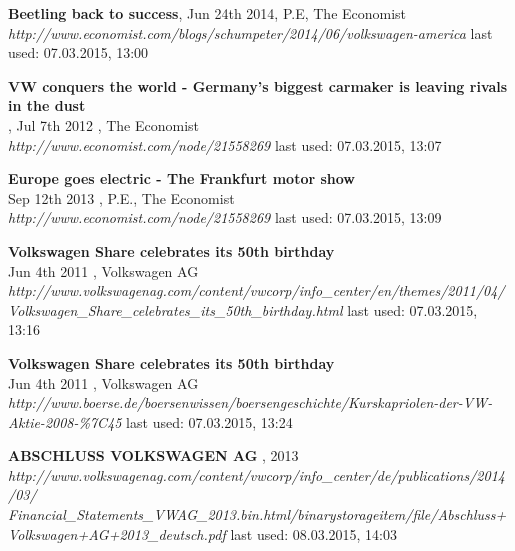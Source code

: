 \documentclass[12pt]{article}
\begin{document}
\small
\newpage\newpage
\begin{thebibliography}{56}

  \textbf{Beetling back to success}, Jun 24th 2014, P.E, The Economist\\
  \textit{http://www.economist.com/blogs/schumpeter/2014/06/volkswagen-america}
  \newline last used: 07.03.2015, 13:00
  
   
  \textbf{VW conquers the world - Germany’s biggest carmaker is leaving rivals in the dust}\\, Jul 7th 2012 , The Economist\\
  \textit{  http://www.economist.com/node/21558269}
  \newline last used: 07.03.2015, 13:07
  
    
   
  \textbf{Europe goes electric - The Frankfurt motor show
}\\Sep 12th 2013 , P.E., The Economist\\
  \textit{  http://www.economist.com/node/21558269}
  \newline last used: 07.03.2015, 13:09
  
  \textbf{Volkswagen Share celebrates its 50th birthday}\\ Jun 4th 2011 , Volkswagen AG\\
  \textit{http://www.volkswagenag.com/content/vwcorp/info\_center/en/themes/2011/04/\\Volkswagen\_Share\_celebrates\_its\_50th\_birthday.html
}
  \newline last used: 07.03.2015, 13:16
  
  \textbf{Volkswagen Share celebrates its 50th birthday}\\ Jun 4th 2011 , Volkswagen AG\\
  \textit{  http://www.boerse.de/boersenwissen/boersengeschichte/Kurskapriolen-der-VW-Aktie-2008-\%7C45}
  \newline last used: 07.03.2015, 13:24
  

  \textbf{ABSCHLUSS VOLKSWAGEN AG }, 2013 \\
  \textit{ http://www.volkswagenag.com/content/vwcorp/info\_center/de/publications/2014/03/\\Financial\_Statements\_VWAG\_2013.bin.html/binarystorageitem/file/Abschluss+Volkswagen+AG+2013\_deutsch.pdf  
}
  \newline last used: 08.03.2015, 14:03
    

\end{thebibliography}
\end{document}
